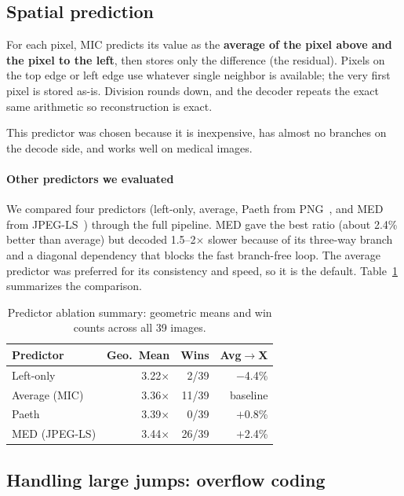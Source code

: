 \documentclass[journal]{IEEEtran}
\begin{document}
\subsection{Spatial prediction}

For each pixel, MIC predicts its value as the \textbf{average of the pixel
above and the pixel to the left}, then stores only the difference (the
residual). Pixels on the top edge or left edge use whatever single neighbor
is available; the very first pixel is stored as-is. Division rounds down, and
the decoder repeats the exact same arithmetic so reconstruction is exact.

This predictor was chosen because it is inexpensive, has almost no branches
on the decode side, and works well on medical images.

\paragraph{Other predictors we evaluated} We compared four predictors
(left-only, average, Paeth from PNG~\cite{png}, and MED from
JPEG-LS~\cite{loco1}) through the full pipeline. MED gave the best ratio
(about 2.4\% better than average) but decoded 1.5--2$\times$ slower because of
its three-way branch and a diagonal dependency that blocks the fast
branch-free loop. The average predictor was preferred for its consistency and
speed, so it is the default. Table~\ref{tab:predictor-summary} summarizes the
comparison.

\begin{table}[htbp]
\centering
\caption{Predictor ablation summary: geometric means and win counts across
all 39 images.}
\label{tab:predictor-summary}
\begin{tabular}{lrrr}
\toprule
Predictor & Geo.\ Mean & Wins & Avg$\to$X \\
\midrule
Left-only & 3.22$\times$ & 2/39 & $-$4.4\% \\
Average (MIC) & 3.36$\times$ & 11/39 & baseline \\
Paeth & 3.39$\times$ & 0/39 & $+$0.8\% \\
MED (JPEG-LS) & 3.44$\times$ & 26/39 & $+$2.4\% \\
\bottomrule
\end{tabular}
\end{table}

\subsection{Handling large jumps: overflow coding}
\label{sec:overflow}
\end{document}
